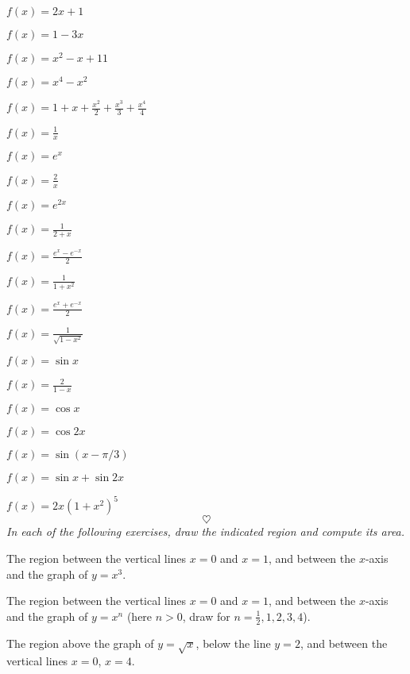 \begin{multicols}{2}
\problem $\displaystyle f(x) = 2x+1 $ %

\problem $\displaystyle f(x) = 1-3x $ %

\problem $\displaystyle f(x) = x^2-x+11 $ %

\problem $\displaystyle f(x) = x^4-x^2 $ %

\problem $\displaystyle f(x) = 1+x+\frac{x^2}{2}+\frac{x^3}{3}+\frac{x^4}{4} $ %

\problem $\displaystyle f(x) = \frac1x $ %

\problem $\displaystyle f(x) = e^x $ %

\problem $\displaystyle f(x) = \frac2x $ %

\problem $\displaystyle f(x) = e^{2x} $ %

\problem $\displaystyle f(x) = \frac1{2+x} $ %

\problem $\displaystyle f(x) = \frac{e^x-e^{-x}}2 $ %

\problem $\displaystyle f(x) = \frac1{1+x^2} $ %

\problem $\displaystyle f(x) = \frac{e^x+e^{-x}}2 $ %

\problem $\displaystyle f(x) = \frac1{\sqrt{1-x^2}} $ %

\problem $\displaystyle f(x) = \sin x $ %

\problem $\displaystyle f(x) = \frac2{1-x} $ %

\problem $\displaystyle f(x) = \cos x $ %

\problem $\displaystyle f(x) = \cos2x $ %

\problem $\displaystyle f(x) = \sin(x-\pi/3) $ %

\problem $\displaystyle f(x) = \sin x + \sin 2x $ %

\problem $\displaystyle f(x) = 2x(1+x^2)^5$ %
\[
\heartsuit
\]
\begingroup
  \itshape In each of the following exercises, draw the indicated region and
  compute its area.
\endgroup

\problem The region between the vertical lines $x=0$ and $x=1$, and between the %
$x$-axis and the graph of $y=x^3$.

\problem The region between the vertical lines $x=0$ and $x=1$, and between the %
$x$-axis and the graph of $y=x^n$ (here $n>0$, draw for $n=\frac12, 1,
2, 3, 4$).

\problem The region above the graph of $y=\sqrt x$, below the line $y=2$, and %
between the vertical lines $x=0$, $x=4$.


\end{multicols}
